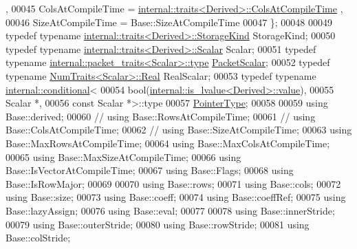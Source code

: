 \begin{DoxyCode}
      ,
00045       ColsAtCompileTime = \hyperlink{struct_eigen_1_1internal_1_1traits}{internal::traits<Derived>::ColsAtCompileTime}
      ,
00046       SizeAtCompileTime = Base::SizeAtCompileTime
00047     \};
00048 
00049     \textcolor{keyword}{typedef} \textcolor{keyword}{typename} \hyperlink{struct_eigen_1_1internal_1_1traits}{internal::traits<Derived>::StorageKind} 
      StorageKind;
00050     \textcolor{keyword}{typedef} \textcolor{keyword}{typename} \hyperlink{struct_eigen_1_1internal_1_1traits}{internal::traits<Derived>::Scalar} Scalar;
00051     \textcolor{keyword}{typedef} \textcolor{keyword}{typename} \hyperlink{group___sparse_core___module}{internal::packet\_traits<Scalar>::type} 
      \hyperlink{group___sparse_core___module}{PacketScalar};
00052     \textcolor{keyword}{typedef} \textcolor{keyword}{typename} \hyperlink{group___core___module_struct_eigen_1_1_num_traits}{NumTraits<Scalar>::Real} RealScalar;
00053     \textcolor{keyword}{typedef} \textcolor{keyword}{typename} \hyperlink{struct_eigen_1_1internal_1_1conditional}{internal::conditional}<
00054                          bool(\hyperlink{struct_eigen_1_1internal_1_1is__lvalue}{internal::is\_lvalue<Derived>::value}),
00055                          Scalar *,
00056                          \textcolor{keyword}{const} Scalar *>::type
00057                      \hyperlink{class_eigen_1_1internal_1_1_tensor_lazy_evaluator_writable}{PointerType};
00058 
00059     \textcolor{keyword}{using} Base::derived;
00060 \textcolor{comment}{//    using Base::RowsAtCompileTime;}
00061 \textcolor{comment}{//    using Base::ColsAtCompileTime;}
00062 \textcolor{comment}{//    using Base::SizeAtCompileTime;}
00063     \textcolor{keyword}{using} Base::MaxRowsAtCompileTime;
00064     \textcolor{keyword}{using} Base::MaxColsAtCompileTime;
00065     \textcolor{keyword}{using} Base::MaxSizeAtCompileTime;
00066     \textcolor{keyword}{using} Base::IsVectorAtCompileTime;
00067     \textcolor{keyword}{using} Base::Flags;
00068     \textcolor{keyword}{using} Base::IsRowMajor;
00069 
00070     \textcolor{keyword}{using} Base::rows;
00071     \textcolor{keyword}{using} Base::cols;
00072     \textcolor{keyword}{using} Base::size;
00073     \textcolor{keyword}{using} Base::coeff;
00074     \textcolor{keyword}{using} Base::coeffRef;
00075     \textcolor{keyword}{using} Base::lazyAssign;
00076     \textcolor{keyword}{using} Base::eval;
00077 
00078     \textcolor{keyword}{using} Base::innerStride;
00079     \textcolor{keyword}{using} Base::outerStride;
00080     \textcolor{keyword}{using} Base::rowStride;
00081     \textcolor{keyword}{using} Base::colStride;

\end{DoxyCode}
